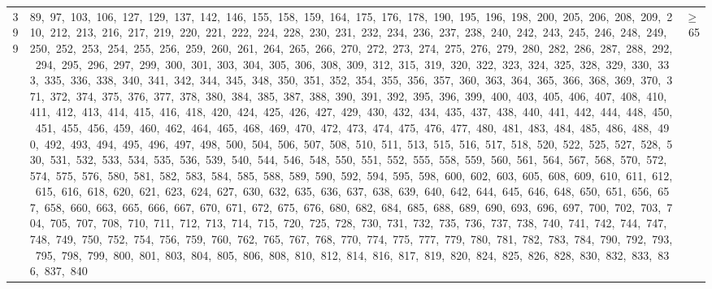 \begin{longtable}{c|p{}|r}
399 & 89,\ 97,\ 103,\ 106,\ 127,\ 129,\ 137,\ 142,\ 146,\ 155,\ 158,\ 159,\ 164,\ 175,\ 176,\ 178,\ 190,\ 195,\ 196,\ 198,\ 200,\ 205,\ 206,\ 208,\ 209,\ 210,\ 212,\ 213,\ 216,\ 217,\ 219,\ 220,\ 221,\ 222,\ 224,\ 228,\ 230,\ 231,\ 232,\ 234,\ 236,\ 237,\ 238,\ 240,\ 242,\ 243,\ 245,\ 246,\ 248,\ 249,\ 250,\ 252,\ 253,\ 254,\ 255,\ 256,\ 259,\ 260,\ 261,\ 264,\ 265,\ 266,\ 270,\ 272,\ 273,\ 274,\ 275,\ 276,\ 279,\ 280,\ 282,\ 286,\ 287,\ 288,\ 292,\ 294,\ 295,\ 296,\ 297,\ 299,\ 300,\ 301,\ 303,\ 304,\ 305,\ 306,\ 308,\ 309,\ 312,\ 315,\ 319,\ 320,\ 322,\ 323,\ 324,\ 325,\ 328,\ 329,\ 330,\ 333,\ 335,\ 336,\ 338,\ 340,\ 341,\ 342,\ 344,\ 345,\ 348,\ 350,\ 351,\ 352,\ 354,\ 355,\ 356,\ 357,\ 360,\ 363,\ 364,\ 365,\ 366,\ 368,\ 369,\ 370,\ 371,\ 372,\ 374,\ 375,\ 376,\ 377,\ 378,\ 380,\ 384,\ 385,\ 387,\ 388,\ 390,\ 391,\ 392,\ 395,\ 396,\ 399,\ 400,\ 403,\ 405,\ 406,\ 407,\ 408,\ 410,\ 411,\ 412,\ 413,\ 414,\ 415,\ 416,\ 418,\ 420,\ 424,\ 425,\ 426,\ 427,\ 429,\ 430,\ 432,\ 434,\ 435,\ 437,\ 438,\ 440,\ 441,\ 442,\ 444,\ 448,\ 450,\ 451,\ 455,\ 456,\ 459,\ 460,\ 462,\ 464,\ 465,\ 468,\ 469,\ 470,\ 472,\ 473,\ 474,\ 475,\ 476,\ 477,\ 480,\ 481,\ 483,\ 484,\ 485,\ 486,\ 488,\ 490,\ 492,\ 493,\ 494,\ 495,\ 496,\ 497,\ 498,\ 500,\ 504,\ 506,\ 507,\ 508,\ 510,\ 511,\ 513,\ 515,\ 516,\ 517,\ 518,\ 520,\ 522,\ 525,\ 527,\ 528,\ 530,\ 531,\ 532,\ 533,\ 534,\ 535,\ 536,\ 539,\ 540,\ 544,\ 546,\ 548,\ 550,\ 551,\ 552,\ 555,\ 558,\ 559,\ 560,\ 561,\ 564,\ 567,\ 568,\ 570,\ 572,\ 574,\ 575,\ 576,\ 580,\ 581,\ 582,\ 583,\ 584,\ 585,\ 588,\ 589,\ 590,\ 592,\ 594,\ 595,\ 598,\ 600,\ 602,\ 603,\ 605,\ 608,\ 609,\ 610,\ 611,\ 612,\ 615,\ 616,\ 618,\ 620,\ 621,\ 623,\ 624,\ 627,\ 630,\ 632,\ 635,\ 636,\ 637,\ 638,\ 639,\ 640,\ 642,\ 644,\ 645,\ 646,\ 648,\ 650,\ 651,\ 656,\ 657,\ 658,\ 660,\ 663,\ 665,\ 666,\ 667,\ 670,\ 671,\ 672,\ 675,\ 676,\ 680,\ 682,\ 684,\ 685,\ 688,\ 689,\ 690,\ 693,\ 696,\ 697,\ 700,\ 702,\ 703,\ 704,\ 705,\ 707,\ 708,\ 710,\ 711,\ 712,\ 713,\ 714,\ 715,\ 720,\ 725,\ 728,\ 730,\ 731,\ 732,\ 735,\ 736,\ 737,\ 738,\ 740,\ 741,\ 742,\ 744,\ 747,\ 748,\ 749,\ 750,\ 752,\ 754,\ 756,\ 759,\ 760,\ 762,\ 765,\ 767,\ 768,\ 770,\ 774,\ 775,\ 777,\ 779,\ 780,\ 781,\ 782,\ 783,\ 784,\ 790,\ 792,\ 793,\ 795,\ 798,\ 799,\ 800,\ 801,\ 803,\ 804,\ 805,\ 806,\ 808,\ 810,\ 812,\ 814,\ 816,\ 817,\ 819,\ 820,\ 824,\ 825,\ 826,\ 828,\ 830,\ 832,\ 833,\ 836,\ 837,\ 840 & $\ge$ 65 \\

\end{longtable}
